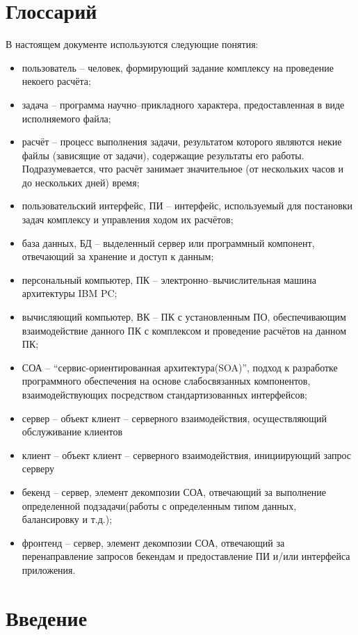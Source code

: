 \documentclass[a4paper,12pt]{report}
\date{\today}
\numberwithin{equation}{section}
\begin{document}
\section{Глоссарий}
В настоящем документе используются следующие понятия:
\begin{itemize}
  \item пользователь -- человек, формирующий задание комплексу на проведение некоего расчёта;
  \item задача -- программа научно--прикладного характера, предоставленная в виде исполняемого файла;
  \item расчёт -- процесс выполнения задачи, результатом которого являются некие файлы (зависящие от задачи), содержащие результаты его работы. Подразумевается, что расчёт занимает значительное (от нескольких часов и до нескольких дней) время;
  \item пользовательский интерфейс, ПИ -- интерфейс, используемый для постановки задач комплексу и управления ходом их расчётов;
  \item база данных, БД -- выделенный сервер или программный компонент, отвечающий за хранение и доступ к данным;
  \item персональный компьютер, ПК -- электронно--вычислительная машина архитектуры IBM PC;
  \item вычисляющий компьютер, ВК -- ПК с установленным ПО, обеспечивающим взаимодействие данного ПК с комплексом и проведение расчётов на данном ПК;
  \item СОА -- ``сервис-ориентированная архитектура(SOA)'', подход к разработке программного обеспечения на основе слабосвязанных компонентов, взаимодействующих посредством стандартизованных интерфейсов;
  \item сервер -- объект клиент -- серверного взаимодействия, осуществляющий обслуживание клиентов
  \item клиент -- объект клиент -- серверного взаимодействия, инициирующий запрос серверу
  \item бекенд -- сервер, элемент декомпозии СОА, отвечающий за выполнение определенной подзадачи(работы с определенным типом данных, балансировку и т.д.);
  \item фронтенд -- сервер, элемент декомпозии СОА, отвечающий за перенаправление запросов бекендам и предоставление ПИ и/или интерфейса приложения.
\end{itemize}

\section{Введение}
\end{document}
